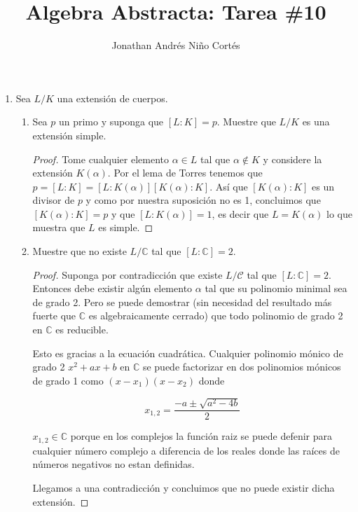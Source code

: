 \documentclass[letter,twoside,12pt]{article}
\title{Algebra Abstracta: Tarea \#10}
\author{Jonathan Andrés Niño Cortés}
\begin{document}
\maketitle
\begin{enumerate}
\item Sea $ L/K $ una extensión de cuerpos.
\begin{enumerate}

\item Sea $ p $ un primo y suponga que $ [L : K] = p $. Muestre que $ L/K $ es una extensión simple.

\begin{proof}
Tome cualquier elemento $ \alpha \in L $ tal que $ \alpha \not \in K $ y considere la extensión $ K(\alpha) $. Por el lema de Torres tenemos que $ p = [L:K]=[L:K(\alpha)][K(\alpha):K] $. Así que $ [K(\alpha):K] $ es un divisor de $ p $ y como por nuestra suposición no es 1, concluimos que $ [K(\alpha):K] = p $ y que $ [L:K(\alpha)]=1 $, es decir que $ L = K(\alpha) $ lo que muestra que $ L $ es simple.   
\end{proof}

\item Muestre que no existe $ L/\mathbb{C} $ tal que $ [L : \mathbb{C}]=2 $.

\begin{proof}
Suponga por contradicción que existe $ L/\mathcal{C} $ tal que $ [L : \mathbb{C}]= 2 $. Entonces debe existir algún elemento $ \alpha $ tal que su polinomio minimal sea de grado 2. Pero se puede demostrar (sin necesidad del resultado más fuerte que $ \mathbb{C} $ es algebraicamente cerrado) que todo polinomio de grado 2 en $ \mathbb{C} $ es reducible.

Esto es gracias a la ecuación cuadrática. Cualquier polinomio mónico de grado 2 $  x^2+ax+b $ en $ \mathbb{C} $ se puede factorizar en dos polinomios mónicos de grado 1 como $ (x-x_1)(x-x_2) $ donde

 \begin{equation}
 x_{1,2} = \frac{-a\pm\sqrt{a^2-4b}}{2} \nonumber
 \end{equation}
 
 $ x_{1,2}\in \mathbb{C} $ porque en los complejos la función raiz se puede defenir para cualquier número complejo a diferencia de los reales donde las raíces de números negativos no estan definidas.
 
 Llegamos a una contradicción y concluimos que no puede existir dicha extensión.
\end{proof}


\end{enumerate}
\end{enumerate}
\end{document}
